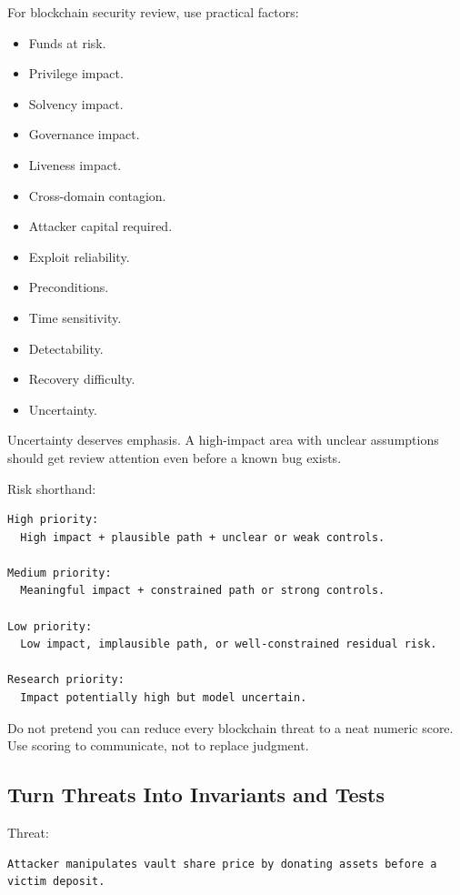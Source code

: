 For blockchain security review, use practical factors:

\begin{itemize}
\tightlist
\item
  Funds at risk.
\item
  Privilege impact.
\item
  Solvency impact.
\item
  Governance impact.
\item
  Liveness impact.
\item
  Cross-domain contagion.
\item
  Attacker capital required.
\item
  Exploit reliability.
\item
  Preconditions.
\item
  Time sensitivity.
\item
  Detectability.
\item
  Recovery difficulty.
\item
  Uncertainty.
\end{itemize}

Uncertainty deserves emphasis. A high-impact area with unclear
assumptions should get review attention even before a known bug exists.

Risk shorthand:

\begin{lstlisting}
High priority:
  High impact + plausible path + unclear or weak controls.

Medium priority:
  Meaningful impact + constrained path or strong controls.

Low priority:
  Low impact, implausible path, or well-constrained residual risk.

Research priority:
  Impact potentially high but model uncertain.
\end{lstlisting}

Do not pretend you can reduce every blockchain threat to a neat numeric
score. Use scoring to communicate, not to replace judgment.

\subsection{Turn Threats Into Invariants and Tests}

Threat:

\begin{lstlisting}
Attacker manipulates vault share price by donating assets before a victim deposit.
\end{lstlisting}


